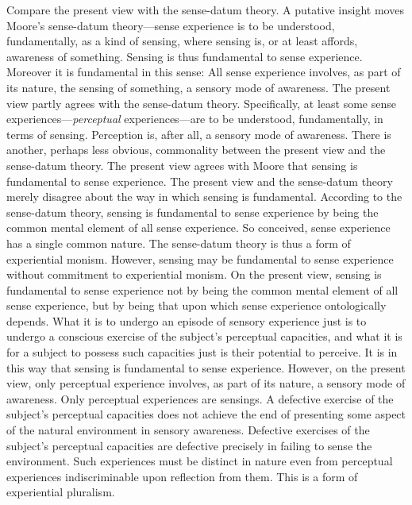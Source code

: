 \documentclass[12pt]{article}
\begin{document}
Compare the present view with the sense-datum theory. A putative insight moves Moore's sense-datum theory---sense experience is to be understood, fundamentally, as a kind of sensing, where sensing is, or at least affords, awareness of something. Sensing is thus fundamental to sense experience. Moreover it is fundamental in this sense: All sense experience involves, as part of its nature, the sensing of something, a sensory mode of awareness. The present view partly agrees with the sense-datum theory. Specifically, at least some sense experiences---\emph{perceptual} experiences---are to be understood, fundamentally, in terms of sensing. Perception is, after all, a sensory mode of awareness. There is another, perhaps less obvious, commonality between the present view and the sense-datum theory. The present view agrees with Moore that sensing is fundamental to sense experience. The present view and the sense-datum theory merely disagree about the way in which sensing is fundamental. According to the sense-datum theory, sensing is fundamental to sense experience by being the common mental element of all sense experience. So conceived, sense experience has a single common nature. The sense-datum theory is thus a form of experiential monism. However, sensing may be fundamental to sense experience without commitment to experiential monism. On the present view, sensing is fundamental to sense experience not by being the common mental element of all sense experience, but by being that upon which sense experience ontologically depends. What it is to undergo an episode of sensory experience just is to undergo a conscious exercise of the subject’s perceptual capacities, and what it is for a subject to possess such capacities just is their potential to perceive. It is in this way that sensing is fundamental to sense experience. However, on the present view, only perceptual experience involves, as part of its nature, a sensory mode of awareness. Only perceptual experiences are sensings. A defective exercise of the subject's perceptual capacities does not achieve the end of presenting some aspect of the natural environment in sensory awareness. Defective exercises of the subject's perceptual capacities are defective precisely in failing to sense the environment. Such experiences must be distinct in nature even from perceptual experiences indiscriminable upon reflection from them. This is a form of experiential pluralism. 
\end{document}
